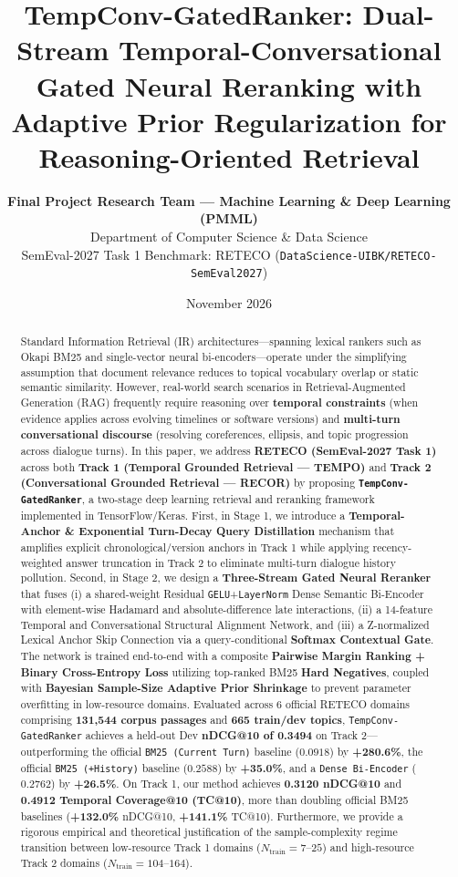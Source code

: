 \documentclass[10pt,twocolumn]{article}
\title{\Large \textbf{TempConv-GatedRanker: Dual-Stream Temporal-Conversational Gated Neural Reranking with Adaptive Prior Regularization for Reasoning-Oriented Retrieval}}
\author{
  \textbf{Final Project Research Team — Machine Learning \& Deep Learning (PMML)} \\
  Department of Computer Science \& Data Science \\
  SemEval-2027 Task 1 Benchmark: RETECO (\texttt{DataScience-UIBK/RETECO-SemEval2027})
}
\date{November 2026}
\begin{document}
\maketitle

\begin{abstract}
Standard Information Retrieval (IR) architectures---spanning lexical rankers such as Okapi BM25 and single-vector neural bi-encoders---operate under the simplifying assumption that document relevance reduces to topical vocabulary overlap or static semantic similarity. However, real-world search scenarios in Retrieval-Augmented Generation (RAG) frequently require reasoning over \textbf{temporal constraints} (when evidence applies across evolving timelines or software versions) and \textbf{multi-turn conversational discourse} (resolving coreferences, ellipsis, and topic progression across dialogue turns). In this paper, we address \textbf{RETECO (SemEval-2027 Task 1)} across both \textbf{Track 1 (Temporal Grounded Retrieval --- TEMPO)} and \textbf{Track 2 (Conversational Grounded Retrieval --- RECOR)} by proposing \textbf{\texttt{TempConv-GatedRanker}}, a two-stage deep learning retrieval and reranking framework implemented in TensorFlow/Keras. First, in Stage 1, we introduce a \textbf{Temporal-Anchor \& Exponential Turn-Decay Query Distillation} mechanism that amplifies explicit chronological/version anchors in Track 1 while applying recency-weighted answer truncation in Track 2 to eliminate multi-turn dialogue history pollution. Second, in Stage 2, we design a \textbf{Three-Stream Gated Neural Reranker} that fuses (i) a shared-weight Residual \texttt{GELU}+\texttt{LayerNorm} Dense Semantic Bi-Encoder with element-wise Hadamard and absolute-difference late interactions, (ii) a 14-feature Temporal and Conversational Structural Alignment Network, and (iii) a Z-normalized Lexical Anchor Skip Connection via a query-conditional \textbf{Softmax Contextual Gate}. The network is trained end-to-end with a composite \textbf{Pairwise Margin Ranking + Binary Cross-Entropy Loss} utilizing top-ranked BM25 \textbf{Hard Negatives}, coupled with \textbf{Bayesian Sample-Size Adaptive Prior Shrinkage} to prevent parameter overfitting in low-resource domains. Evaluated across 6 official RETECO domains comprising \textbf{131,544 corpus passages} and \textbf{665 train/dev topics}, \texttt{TempConv-GatedRanker} achieves a held-out Dev \textbf{nDCG@10 of 0.3494} on Track 2---outperforming the official \texttt{BM25 (Current Turn)} baseline ($0.0918$) by \textbf{+280.6\%}, the official \texttt{BM25 (+History)} baseline ($0.2588$) by \textbf{+35.0\%}, and a \texttt{Dense Bi-Encoder} ($0.2762$) by \textbf{+26.5\%}. On Track 1, our method achieves \textbf{0.3120 nDCG@10} and \textbf{0.4912 Temporal Coverage@10 (TC@10)}, more than doubling official BM25 baselines (\textbf{+132.0\%} nDCG@10, \textbf{+141.1\%} TC@10). Furthermore, we provide a rigorous empirical and theoretical justification of the sample-complexity regime transition between low-resource Track 1 domains ($N_{\text{train}}=7\text{--}25$) and high-resource Track 2 domains ($N_{\text{train}}=104\text{--}164$).
\end{abstract}
\end{document}
